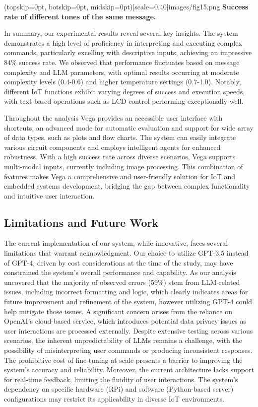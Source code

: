 \documentclass{ieeeaccess}
\begin{document}
\Figure[t!](topskip=0pt, botskip=0pt,
midskip=0pt)[scale=0.40]{{images/fig15.png}}
{ \textbf{Success rate of different tones of the same message.}\label{fig15}}

In summary, our experimental results reveal several key insights. The system demonstrates a high level of proficiency in interpreting and executing complex commands, particularly excelling with descriptive inputs, achieving an impressive 84\% success rate. We observed that performance fluctuates based on message complexity and LLM parameters, with optimal results occurring at moderate complexity levels (0.4-0.6) and higher temperature settings (0.7-1.0). Notably, different IoT functions exhibit varying degrees of success and execution speeds, with text-based operations such as LCD control performing exceptionally well. 

Throughout the analysis Vega provides an accessible user interface with shortcuts, an advanced mode for automatic evaluation and support for wide array of data types, such as plots and flow charts. The system can easily integrate various circuit components and employs intelligent agents for enhanced robustness. With a high success rate across diverse scenarios, Vega supports multi-modal inputs, currently including image processing. This combination of features makes Vega a comprehensive and user-friendly solution for IoT and embedded systems development, bridging the gap between complex functionality and intuitive user interaction.

\subsection{Limitations and Future Work}
The current implementation of our system, while innovative, faces several limitations that warrant acknowledgment. Our choice to utilize GPT-3.5 instead of GPT-4, driven by cost considerations at the time of the study, may have constrained the system's overall performance and capability. As our analysis uncovered that the majority of observed errors (59\%) stem from LLM-related issues, including incorrect formatting and logic, which clearly indicates areas for future improvement and refinement of the system, however utilizing GPT-4 could help mitigate those issues. A significant concern arises from the reliance on OpenAI's cloud-based service, which introduces potential data privacy issues as user interactions are processed externally. Despite extensive testing across various scenarios, the inherent unpredictability of LLMs remains a challenge, with the possibility of misinterpreting user commands or producing inconsistent responses. The prohibitive cost of fine-tuning at scale presents a barrier to improving the system's accuracy and reliability. Moreover, the current architecture lacks support for real-time feedback, limiting the fluidity of user interactions. The system's dependency on specific hardware (RPi) and software (Python-based server) configurations may restrict its applicability in diverse IoT environments.
\end{document}

